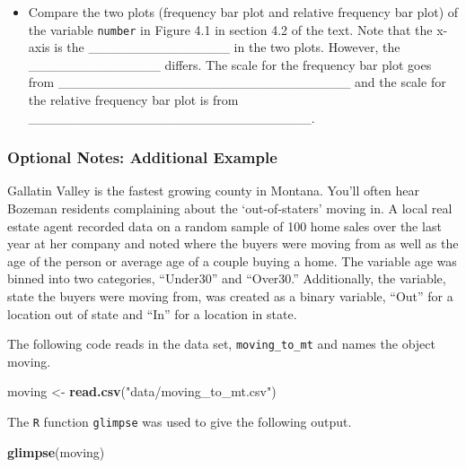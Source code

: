 \documentclass[
]{report}
\newenvironment{Shaded}{\begin{snugshade}}{\end{snugshade}}
\newcommand{\FunctionTok}[1]{\textcolor[rgb]{0.13,0.29,0.53}{\textbf{#1}}}
\newcommand{\NormalTok}[1]{#1}
\newcommand{\OtherTok}[1]{\textcolor[rgb]{0.56,0.35,0.01}{#1}}
\newcommand{\StringTok}[1]{\textcolor[rgb]{0.31,0.60,0.02}{#1}}
\providecommand{\tightlist}{%
  \setlength{\itemsep}{0pt}\setlength{\parskip}{0pt}}
\begin{document}
\begin{itemize}
\tightlist
\item
  Compare the two plots (frequency bar plot and relative frequency bar plot) of the variable \texttt{number} in Figure 4.1 in section 4.2 of the text. Note that the x-axis is the \_\_\_\_\_\_\_\_\_\_\_\_\_\_\_ in the two plots. However, the \_\_\_\_\_\_\_\_\_\_\_\_\_\_ differs. The scale for the frequency bar plot goes from \_\_\_\_\_\_\_\_\_\_\_\_\_\_\_\_\_\_\_\_\_\_\_\_\_\_\_\_\_\_\_ and the scale for the relative frequency bar plot is from \_\_\_\_\_\_\_\_\_\_\_\_\_\_\_\_\_\_\_\_\_\_\_\_\_\_\_\_\_\_.
\end{itemize}

\subsubsection*{Optional Notes: Additional Example}\label{optional-notes-additional-example-2}

Gallatin Valley is the fastest growing county in Montana. You'll often hear Bozeman residents complaining about the `out-of-staters' moving in. A local real estate agent recorded data on a random sample of 100 home sales over the last year at her company and noted where the buyers were moving from as well as the age of the person or average age of a couple buying a home. The variable age was binned into two categories, ``Under30'' and ``Over30.'' Additionally, the variable, state the buyers were moving from, was created as a binary variable, ``Out'' for a location out of state and ``In'' for a location in state.

The following code reads in the data set, \texttt{moving\_to\_mt} and names the object moving.

\begin{Shaded}
\begin{Highlighting}[]
\NormalTok{moving }\OtherTok{\textless{}{-}} \FunctionTok{read.csv}\NormalTok{(}\StringTok{"data/moving\_to\_mt.csv"}\NormalTok{)}
\end{Highlighting}
\end{Shaded}

The \texttt{R} function \texttt{glimpse} was used to give the following output.

\begin{Shaded}
\begin{Highlighting}[]
\FunctionTok{glimpse}\NormalTok{(moving)}
\end{Highlighting}
\end{Shaded}
\end{document}
